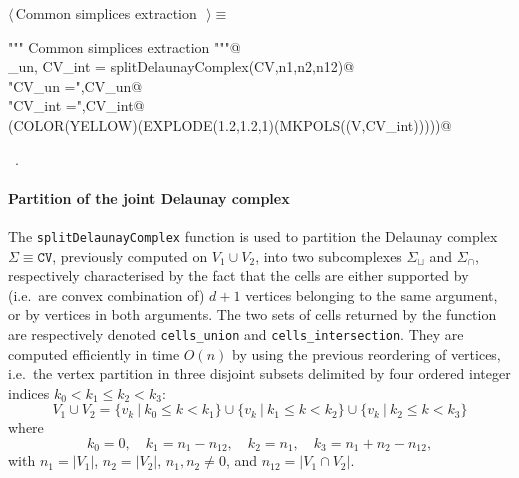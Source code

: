 \documentclass[11pt,oneside]{article}	%
\begin{document}
\begin{flushleft} \small \label{scrap14}
$\langle\,$Common simplices extraction\nobreak\ {\footnotesize {}}$\,\rangle\equiv$
\vspace{-1ex}
\begin{list}{}{} \item
\mbox{}\verb@""" Common simplices extraction """@\\
\mbox{}\verb@CV_un, CV_int = splitDelaunayComplex(CV,n1,n2,n12)@\\
\mbox{}\verb@print "\n CV_un =",CV_un@\\
\mbox{}\verb@print "\n CV_int =",CV_int@\\
\mbox{}\verb@VIEW(COLOR(YELLOW)(EXPLODE(1.2,1.2,1)(MKPOLS((V,CV_int)))))@\\
\mbox{}\verb@@{\NWsep}
\end{list}
\vspace{-1ex}
\footnotesize\addtolength{\baselineskip}{-1ex}
\begin{list}{}{\setlength{\itemsep}{-\parsep}\setlength{\itemindent}{-\leftmargin}}
\item \NWtxtMacroRefIn\ .
\end{list}
\end{flushleft}


\paragraph{Partition of the joint Delaunay complex} 

The \texttt{splitDelaunayComplex} function is used to partition the Delaunay complex $\Sigma\equiv\texttt{CV}$, previously computed on $V_1 \cup V_2$, into two subcomplexes $\Sigma_\sqcup$ and $\Sigma_\cap$, respectively characterised by the fact that the cells  are either supported by (i.e.~are convex combination of)  $d+1$ vertices belonging to the same argument, or by vertices in both arguments.
The two sets of cells returned by the function are respectively denoted \texttt{cells\_union} and \texttt{cells\_intersection}. They are computed efficiently in time $O(n)$ by using the previous reordering of vertices, i.e.~the vertex partition in three disjoint subsets delimited by four ordered integer indices $k_0 < k_1 \leq k_2 < k_3$:
\[
V_1 \cup V_2 = 
\{v_k\ |\ k_0\leq k< k_1\} \cup
\{v_k\ |\ k_1\leq k< k_2\} \cup
\{v_k\ |\ k_2\leq k< k_3\}
\]
where
\[
k_0 =0, \quad k_1 =n_1-n_{12}, \quad k_2 =n_1, \quad  k_3=n_1+n_2-n_{12},
\]
with $n_1=|V_1|$, $n_2=|V_2|$, $n_1, n_2\not=0$, and $n_{12}=|V_1\cap V_2|$.
\end{document}
